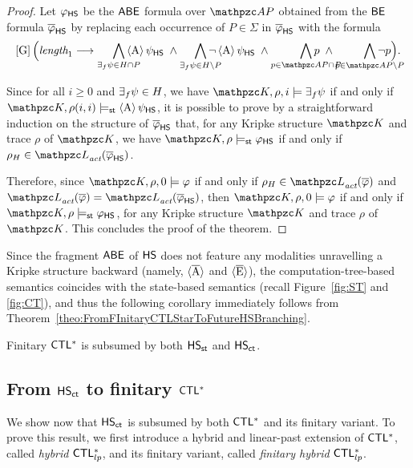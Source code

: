 \begin{proof}
Let $\varphi_{\text{\sffamily HS}}$ be the $\mathsf{A}\mathsf{B}\mathsf{E}$ formula over $\Prop$ obtained from the $\mathsf{BE}$ formula $\overline{\varphi}_{\text{\sffamily HS}}$ by replacing each occurrence of
$P\in \Sigma$ in $\overline{\varphi}_{\text{\sffamily HS}}$ with the formula
\[
\hsGu\Big(\Length_1 \longrightarrow  \smashoperator[r]{\bigwedge_{\EQF\psi\in H\cap P}} \hsA\psi_\HS \;\wedge  \smashoperator[r]{\bigwedge_{\EQF\psi\in H\setminus P}}\neg \hsA\psi_\HS \;\wedge \smashoperator[r]{\bigwedge_{p\in \Prop\cap P}} p\;\wedge  \smashoperator[r]{\bigwedge_{p\in \Prop\setminus P}} \neg p\Big).
\]

Since for all $i\geq 0$ and $\exists_f\psi\in H$, we have $\Ku,\rho,i\models \EQF\psi$ if and only if  $\Ku,\rho(i,i)\models_\stat \hsA\psi_\HS$, it is possible to prove by a straightforward induction
on the structure of $\overline{\varphi}_{\text{\sffamily HS}}$ that, for any Kripke structure $\Ku$ and trace $\rho$ of $\Ku$, we have
$\Ku,\rho\models_\stat \varphi_\HS$ if and only if $\rho_H\in \Lang_\act(\overline{\varphi}_\HS)$.
%

   Therefore, since $\Ku,\rho,0\models \varphi$ if and only if $\rho_H\in \Lang_\act(\overline{\varphi})$ and
   $\Lang_\act(\overline{\varphi})= \Lang_\act(\overline{\varphi}_\HS)$, then $\Ku,\rho,0\models \varphi$ if and only if  $\Ku,\rho\models_\stat \varphi_\HS$, for any Kripke structure
 $\Ku$ and trace $\rho$ of $\Ku$. 
This concludes the proof of the theorem.
  \end{proof}

  Since the fragment $\mathsf{A}\mathsf{B}\mathsf{E}$ of $\text{\sffamily HS}$ does not feature any modalities unravelling a Kripke structure backward (namely, $\operatorname{\langle \overline{A}\rangle}$ and $\operatorname{\langle \overline{E}\rangle}$), the computation-tree-based semantics coincides with the state-based semantics (recall Figure~\ref{fig:ST} and \ref{fig:CT}), and thus the following corollary immediately follows from Theorem~\ref{theo:FromFInitaryCTLStarToFutureHSBranching}. 
%
  \begin{corollary}\label{cor:FromFInitaryCTLStarToFutureHSBranching} Finitary $\text{\sffamily CTL$^{*}$}$ is subsumed by both $\text{\sffamily HS}_{\mathsf{st}}$ and $\text{\sffamily HS}_{\mathsf{ct}}$.
  \end{corollary}


\subsection{From $\text{\sffamily HS}_{\mathsf{ct}}$ to finitary $\text{\sffamily CTL$^{*}$}$}
We show now that $\text{\sffamily HS}_{\mathsf{ct}}$ is subsumed by both $\text{\sffamily CTL$^{*}$}$ and its finitary variant.
To prove this result,  we first introduce a hybrid and linear-past extension of
$\text{\sffamily CTL$^{*}$}$, called \emph{hybrid} $\text{\sffamily CTL$^{*}_{lp}$}$, and its finitary variant, called \emph{finitary hybrid} $\text{\sffamily CTL$^{*}_{lp}$}$.

